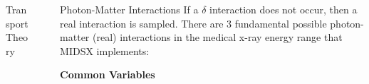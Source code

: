 \documentclass[final]{beamer}
\newlength{\sepwidth}
\newlength{\colwidth}
\newcommand{\separatorcolumn}{\begin{column}{\sepwidth}\end{column}}
\begin{document}
\begin{frame}[t]
\begin{columns}[t]
\begin{column}{\colwidth}
\begin{block}{Transport Theory}

  \end{block}
\end{column}

\separatorcolumn

\begin{column}{\colwidth}






  \begin{block}{Photon-Matter Interactions}
    If a $\delta$ interaction does not occur, then a real interaction is sampled. There are 3 fundamental possible photon-matter (real) interactions in the medical x-ray energy range that MIDSX implements:
    \vspace{-0.5\baselineskip}
    \begin{center}
      \textbf{Common Variables}
    \end{center}


\end{block}
\end{column}
\end{columns}
\end{frame}
\end{document}

